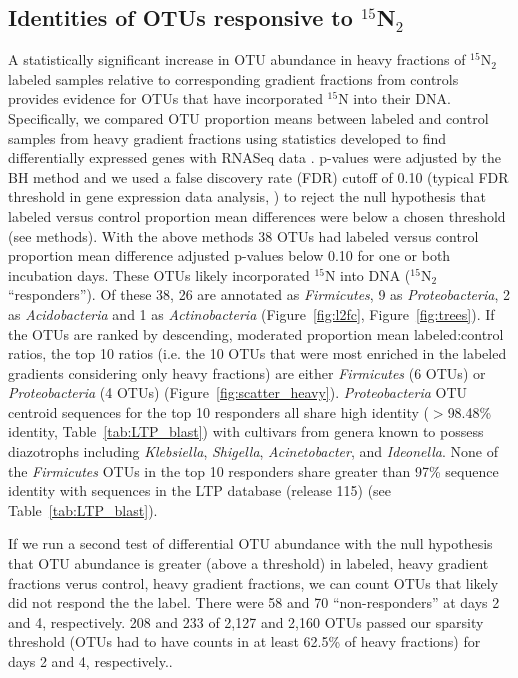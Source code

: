 \subsection{Identities of OTUs responsive to $^{15}$N$_{2}$} 
A statistically significant increase in OTU abundance in heavy fractions of
$^{15}$N$_{2}$ labeled samples relative to corresponding gradient fractions
from controls provides evidence for OTUs that have incorporated $^{15}$N into
their DNA. Specifically, we compared OTU proportion means between labeled and
control samples from heavy gradient fractions using statistics developed to
find differentially expressed genes with RNASeq data \citep{24699258, Love_2014}. p-values were adjusted by the BH method \citep{citeulike:1042553} and we used a false
discovery rate (FDR) cutoff of 0.10 (typical FDR threshold in gene expression
data analysis, \citep{Love_2014}) to reject the null hypothesis that labeled versus
control proportion mean differences were below a chosen threshold (see
methods). With the above methods 38 OTUs had labeled versus control proportion
mean difference adjusted p-values below 0.10 for one or both incubation days.
These OTUs likely incorporated $^{15}$N into DNA ($^{15}$N$_{2}$
``responders''). Of these 38, 26 are annotated as \textit{Firmicutes}, 9 as
\textit{Proteobacteria}, 2 as \textit{Acidobacteria} and 1 as
\textit{Actinobacteria} (Figure~\ref{fig:l2fc}, Figure~\ref{fig:trees}). If the
OTUs are ranked by descending, moderated proportion mean labeled:control
ratios, the top 10 ratios (i.e. the 10 OTUs that were most enriched in the
labeled gradients considering only heavy fractions) are either
\textit{Firmicutes} (6 OTUs) or \textit{Proteobacteria} (4 OTUs)
(Figure~\ref{fig:scatter_heavy}).  \textit{Proteobacteria} OTU centroid
sequences for the top 10 responders all share high identity ($>$98.48\%
identity, Table~\ref{tab:LTP_blast}) with cultivars from genera known to
possess diazotrophs including \textit{Klebsiella}, \textit{Shigella},
\textit{Acinetobacter}, and \textit{Ideonella}. None of the \textit{Firmicutes}
OTUs in the top 10 responders share greater than 97\% sequence identity with
sequences in the LTP database (release 115) (see Table~\ref{tab:LTP_blast}).

If we run a second test of differential OTU abundance with the null hypothesis
that OTU abundance is greater (above a threshold) in labeled, heavy gradient
fractions verus control, heavy gradient fractions, we can count OTUs that likely
did not respond the the label. There were 58 and 70 ``non-responders'' at days
2 and 4, respectively. 208 and 233 of 2,127 and 2,160 OTUs passed our sparsity
threshold (OTUs had to have counts in at least 62.5\% of heavy fractions) for
days 2 and 4, respectively..


